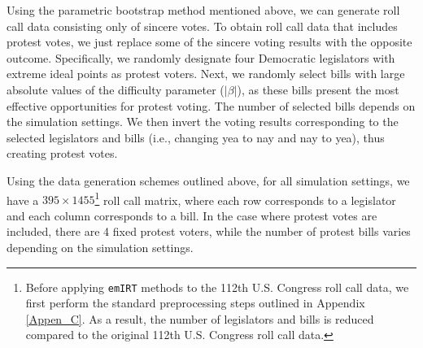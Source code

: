\documentclass[11pt]{article}
\begin{document}
Using the parametric bootstrap method mentioned above, we can generate roll call data consisting only of sincere votes. To obtain roll call data that includes protest votes, we just replace some of the sincere voting results with the opposite outcome. Specifically, we randomly designate four Democratic legislators with extreme ideal points as protest voters. Next, we randomly select bills with large absolute values of the difficulty parameter ($ |\beta| $), as these bills present the most effective opportunities for protest voting. The number of selected bills depends on the simulation settings. We then invert the voting results corresponding to the selected legislators and bills (i.e., changing yea to nay and nay to yea), thus creating protest votes.


Using the data generation schemes outlined above, for all simulation settings, we have a $ 395 \times 1455 $\footnote{Before applying \texttt{emIRT} methods to the 112th U.S. Congress roll call data, we first perform the standard preprocessing steps outlined in Appendix \ref{Appen_C}. As a result, the number of legislators and bills is reduced compared to the original 112th U.S. Congress roll call data.} roll call matrix, where each row corresponds to a legislator and each column corresponds to a bill. In the case where protest votes are included, there are 4 fixed protest voters, while the number of protest bills varies depending on the simulation settings.


\end{document}
